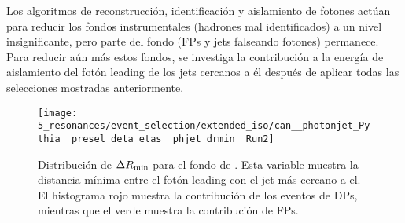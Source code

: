 Los algoritmos de reconstrucción, identificación y aislamiento de fotones actúan para reducir los fondos instrumentales (hadrones mal identificados) a un nivel insignificante, pero parte del fondo (\acp{FP} y jets falseando fotones) permanece.
Para reducir aún más estos fondos, se investiga la contribución a la energía de aislamiento del fotón leading de los jets cercanos a él después de aplicar todas las selecciones mostradas anteriormente.

\begin{figure}[ht!]
    \centering
    \texttt{[image: 5\_resonances/event\_selection/extended\_iso/can\_\_photonjet\_Pythia\_\_presel\_deta\_etas\_\_phjet\_drmin\_\_Run2]}
    \caption{Distribución de \(\Delta R_{\text{min}}\) para el fondo de \gammajet. Esta variable muestra la distancia mínima entre el fotón leading con el jet más cercano a el. El histograma rojo muestra la contribución de los eventos de \acp{DP}, mientras que el verde muestra la contribución de \acp{FP}.}
    \label{fig:evt_selection:sr_opt:extended_iso:phjet_drmin}
\end{figure}

